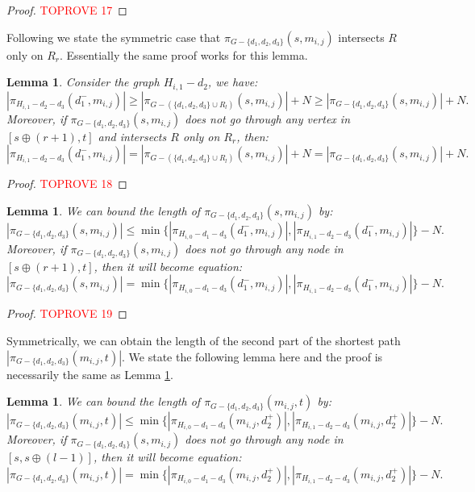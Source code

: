 \documentclass[11pt]{article}
\theoremstyle{plain}
\newtheorem{lemma}[theorem]{Lemma}
\theoremstyle{definition}
\newcommand{\set}[1]{\{ #1 \}}
\newcommand{\og}[3]{\pi_{G-#3}\left(#1,#2\right)}
\begin{document}
\begin{proof}\textcolor{red}{TOPROVE 17}\end{proof}

Following we state the symmetric case that $\og{s}{m_{i,j}}{\set{d_1, d_2, d_3}}$ intersects $R$ only on $R_r$. Essentially the same proof works for this lemma.

\begin{lemma}\label{lemma:smcase2}
    Consider the graph $H_{i,1}-d_2$, we have:
    \[|\pi_{H_{i,1}-d_2-d_3}(d_1^-,m_{i,j})| \geq |\og{s}{m_{i,j}}{(\set{d_1, d_2, d_3} \cup R_l)}| + N \geq |\og{s}{m_{i,j}}{\set{d_1, d_2, d_3}}| + N.\]
    Moreover, if $\og{s}{m_{i,j}}{\set{d_1, d_2, d_3}}$ {does not go through any vertex in $[s \oplus (r+1),t]$ and} intersects $R$ only on $R_r$, then:
    \[|\pi_{H_{i,1}-d_2-d_3}(d_1^-,m_{i,j})| = |\og{s}{m_{i,j}}{(\set{d_1, d_2, d_3} \cup R_l)}| + N = |\og{s}{m_{i,j}}{\set{d_1, d_2, d_3}}| + N.\]
\end{lemma}

\begin{proof}\textcolor{red}{TOPROVE 18}\end{proof}

\begin{lemma}\label{lemma:sm}
    We can bound the length of $\og{s}{m_{i,j}}{\set{d_1, d_2, d_3}}$ by:
    \[|\og{s}{m_{i,j}}{\set{d_1, d_2, d_3}}| \leq \min \{ |\pi_{H_{i,0}-d_1-d_3}(d_1^-,m_{i,j})|,|\pi_{H_{i,1}-d_2-d_3}(d_1^-,m_{i,j})| \}-N.\]
    Moreover, if $\og{s}{m_{i,j}}{\set{d_1, d_2, d_3}}$ does not go through any node in $[s \oplus (r+1),t]$, then it will become equation:
    \[|\og{s}{m_{i,j}}{\set{d_1, d_2, d_3}}| = \min \{ |\pi_{H_{i,0}-d_1-d_3}(d_1^-,m_{i,j})|,|\pi_{H_{i,1}-d_2-d_3}(d_1^-,m_{i,j})| \} - N.\]
\end{lemma}

\begin{proof}\textcolor{red}{TOPROVE 19}\end{proof}

Symmetrically, we can obtain the length of the second part of the shortest path $|\og{m_{i,j}}{t}{\set{d_1, d_2, d_3}}|$. We state the following lemma here and the proof is necessarily the same as Lemma \ref{lemma:sm}.

\begin{lemma}\label{lemma:mt}
    We can bound the length of $\og{m_{i,j}}{t}{\set{d_1, d_2, d_3}}$ by:
    \[|\og{m_{i,j}}{t}{\set{d_1, d_2, d_3}}| {\leq} \min \{ |\pi_{H_{i,0}-d_1-d_3}(m_{i,j},d_2^+)|,|\pi_{H_{i,1}-d_2-d_3}(m_{i,j},d_2^+)| \} -N.\]
    Moreover, if $\og{s}{m_{i,j}}{\set{d_1, d_2, d_3}}$ {does not go through any node in $[s, s \oplus (l-1)]$}, then it will become equation:
    \[|\og{m_{i,j}}{t}{\set{d_1, d_2, d_3}}| = \min \{ |\pi_{H_{i,0}-d_1-d_3}(m_{i,j},d_2^+)|,|\pi_{H_{i,1}-d_2-d_3}(m_{i,j},d_2^+)| \} -N.\]
\end{lemma}
\end{document}

